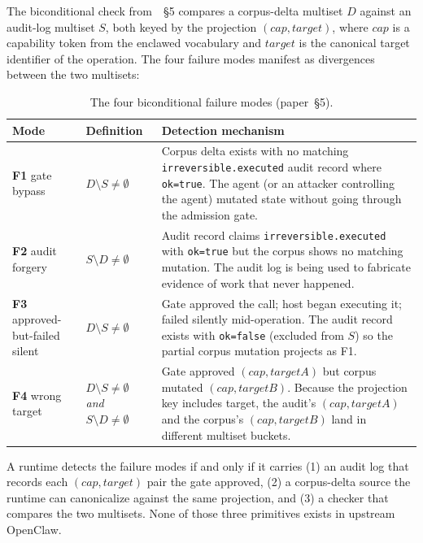 \documentclass[11pt]{article}
\begin{document}
The biconditional check from~\cite{Metere2026enclawed}~§5 compares a
corpus-delta multiset $D$ against an audit-log multiset $S$, both
keyed by the projection $(\mathit{cap}, \mathit{target})$, where
$\mathit{cap}$ is a capability token from the enclawed vocabulary and
$\mathit{target}$ is the canonical target identifier of the
operation. The four failure modes manifest as divergences between the
two multisets:

\begin{table}[h]
\centering
\small
\begin{tabular}{|p{2.3cm}|p{4.0cm}|p{8.0cm}|}
\hline
\textbf{Mode} & \textbf{Definition} & \textbf{Detection mechanism} \\
\hline
\textbf{F1} gate bypass &
$D \setminus S \neq \emptyset$ &
Corpus delta exists with no matching \texttt{irreversible.executed} audit
record where \texttt{ok=true}. The agent (or an attacker controlling the
agent) mutated state without going through the admission gate. \\
\hline
\textbf{F2} audit forgery &
$S \setminus D \neq \emptyset$ &
Audit record claims \texttt{irreversible.executed} with \texttt{ok=true}
but the corpus shows no matching mutation. The audit log is being used to
fabricate evidence of work that never happened. \\
\hline
\textbf{F3} approved-but-failed silent &
$D \setminus S \neq \emptyset$ &
Gate approved the call; host began executing it; failed silently
mid-operation. The audit record exists with \texttt{ok=false} (excluded
from $S$) so the partial corpus mutation projects as F1. \\
\hline
\textbf{F4} wrong target &
$D \setminus S \neq \emptyset$ \emph{and} $S \setminus D \neq \emptyset$ &
Gate approved $(\mathit{cap}, \mathit{targetA})$ but corpus mutated
$(\mathit{cap}, \mathit{targetB})$. Because the projection key includes
target, the audit's $(\mathit{cap}, \mathit{targetA})$ and the corpus's
$(\mathit{cap}, \mathit{targetB})$ land in different multiset buckets. \\
\hline
\end{tabular}
\caption{The four biconditional failure modes (paper~§5).}
\label{tab:fmodes}
\end{table}

A runtime detects the failure modes if and only if it carries (1) an
audit log that records each $(\mathit{cap}, \mathit{target})$ pair the gate
approved, (2) a corpus-delta source the runtime can canonicalize against
the same projection, and (3) a checker that compares the two multisets.
None of those three primitives exists in upstream OpenClaw.
\end{document}
